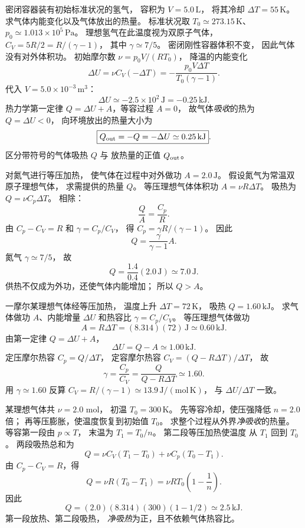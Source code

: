 密闭容器装有初始标准状况的氢气，
容积为 $V=5.0\,\mathrm L$，
将其冷却
$\Delta T=55\,\mathrm K$。
求气体内能变化以及气体放出的热量。
\exsolution
标准状况取
$T_0\simeq273.15\,\mathrm K$、
$p_0\simeq1.013\times10^5\,\mathrm{Pa}$。
理想氢气在此温度视为双原子气体，
$C_V=5R/2=R/(\gamma-1)$，
其中 $\gamma\simeq7/5$。
密闭刚性容器体积不变，
因此气体没有对外体积功。
初始摩尔数
$\nu=p_0V/(RT_0)$，
降温的内能变化
\[
\Delta U=\nu C_V(-\Delta T)
=-\frac{p_0V\Delta T}{T_0(\gamma-1)}.
\]
代入 $V=5.0\times10^{-3}\,\mathrm{m^3}$：
\[
\boxed{\Delta U\simeq-2.5\times10^2\,\mathrm J
=-0.25\,\mathrm{kJ}}.
\]
热力学第一定律
$Q=\Delta U+A$，等容过程 $A=0$，
故气体\emph{吸收}的热为 $Q=\Delta U<0$，
向环境放出的热量大小为
\[
\boxed{Q_{\rm out}=-Q=-\Delta U\simeq0.25\,\mathrm{kJ}}.
\]
\excheck 区分带符号的气体吸热 $Q$ 与
放热量的正值 $Q_{\rm out}$。

对氮气进行等压加热，
使气体在过程中对外做功
$A=2.0\,\mathrm J$。
假设氮气为常温双原子理想气体，
求需提供的热量 $Q$。
\exsolution
等压理想气体体积功
$A=\nu R\Delta T$。
吸热为
$Q=\nu C_p\Delta T$。
相除：
\[
\frac QA=\frac{C_p}{R}.
\]
由 $C_p-C_V=R$ 和
$\gamma=C_p/C_V$，
得 $C_p=\gamma R/(\gamma-1)$。
因此
\[
\boxed{Q=\frac{\gamma}{\gamma-1}A}.
\]
氮气 $\gamma\simeq7/5$，
故
\[
\boxed{Q=\frac{1.4}{0.4}(2.0\,\mathrm J)
\simeq7.0\,\mathrm J}.
\]
\excheck 供热不仅成为外功，还使气体内能增加；
所以 $Q>A$。

一摩尔某理想气体经等压加热，
温度上升 $\Delta T=72\,\mathrm K$，
吸热 $Q=1.60\,\mathrm{kJ}$。
求气体做功 $A$、内能增量 $\Delta U$
和热容比 $\gamma=C_p/C_V$。
\exsolution
等压理想气体做功
\[
\boxed{A=R\Delta T
=(8.314)(72)\,\mathrm J\simeq0.60\,\mathrm{kJ}}.
\]
由第一定律
$Q=\Delta U+A$，
\[
\boxed{\Delta U=Q-A\simeq1.00\,\mathrm{kJ}}.
\]
定压摩尔热容
$C_p=Q/\Delta T$，
定容摩尔热容
$C_V=(Q-R\Delta T)/\Delta T$，
故
\[
\boxed{\gamma=\frac{C_p}{C_V}
=\frac{Q}{Q-R\Delta T}
\simeq1.60}.
\]
\excheck 用 $\gamma\simeq1.60$ 反算
$C_V=R/(\gamma-1)\simeq13.9\,\mathrm{J/(mol\,K)}$，
与 $\Delta U/\Delta T$ 一致。

某理想气体共 $\nu=2.0$ mol，
初温 $T_0=300\,\mathrm K$。
先等容冷却，使压强降低
$n=2.0$ 倍；
再等压膨胀，使温度恢复到初始值 $T_0$。
求整个过程从外界\emph{净吸收}的热量。
\exsolution
等容第一段由 $p\propto T$，
末温为 $T_1=T_0/n$。
第二段等压加热使温度
从 $T_1$ 回到 $T_0$。
两段吸热总和为
\[
Q=\nu C_V(T_1-T_0)
+\nu C_p(T_0-T_1).
\]
由 $C_p-C_V=R$，得
\[
Q=\nu R(T_0-T_1)
=\nu RT_0\left(1-\frac1n\right).
\]
因此
\[
\boxed{Q=(2.0)(8.314)(300)(1-1/2)
\simeq2.5\,\mathrm{kJ}}.
\]
\excheck 第一段放热、第二段吸热，
\emph{净吸热}为正，且不依赖气体热容比。

